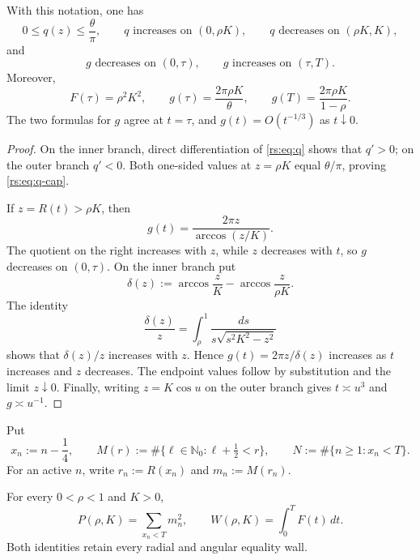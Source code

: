 \begin{lemma}
\label{rs:lem:shape}
With this notation, one has
\begin{equation}
 0\leq q(z)\leq\frac{\theta}{\pi},
 \qquad
 q\text{ increases on }(0,\rho K),
 \qquad q\text{ decreases on }(\rho K,K),
 \label{rs:eq:q-cap}
\end{equation}
and
\begin{equation}
 g\text{ decreases on }(0,\tau),
 \qquad g\text{ increases on }(\tau,T).
 \label{rs:eq:g-shape}
\end{equation}
Moreover,
\begin{equation}
 F(\tau)=\rho^2K^2,
 \qquad
 g(\tau)=\frac{2\pi\rho K}{\theta},
 \qquad
 g(T)=\frac{2\pi\rho K}{1-\rho}.
 \label{rs:eq:g-data}
\end{equation}
The two formulas for $g$ agree at $t=\tau$, and
$g(t)=O(t^{-1/3})$ as $t\downarrow0$.
\end{lemma}

\begin{proof}
On the inner branch, direct differentiation of \eqref{rs:eq:q} shows that
$q'>0$; on the outer branch $q'<0$.  Both one-sided values at
$z=\rho K$ equal $\theta/\pi$, proving \eqref{rs:eq:q-cap}.

If $z=R(t)>\rho K$, then
\[
 g(t)=\frac{2\pi z}{\arccos(z/K)}.
\]
The quotient on the right increases with $z$, while $z$ decreases with
$t$, so $g$ decreases on $(0,\tau)$.  On the inner branch put
\[
 \delta(z):=\arccos\frac zK-\arccos\frac z{\rho K}.
\]
The identity
\[
 \frac{\delta(z)}z
 =\int_\rho^1\frac{ds}{s\sqrt{s^2K^2-z^2}}
\]
shows that $\delta(z)/z$ increases with $z$.  Hence
$g(t)=2\pi z/\delta(z)$ increases as $t$ increases and $z$ decreases.
The endpoint values follow by substitution and the limit $z\downarrow0$.
Finally, writing $z=K\cos u$ on the outer branch gives
$t\asymp u^3$ and $g\asymp u^{-1}$.
\end{proof}

Put
\begin{equation}
 x_n:=n-\frac14,
 \qquad
 M(r):=\#\{\ell\in\mathbb N_0:\ell+\tfrac12<r\},
 \qquad
 N:=\#\{n\geq1:x_n<T\}.
 \label{rs:eq:grids}
\end{equation}
For an active $n$, write $r_n:=R(x_n)$ and $m_n:=M(r_n)$.

\begin{lemma}
\label{rs:lem:layer-cake}
For every $0<\rho<1$ and $K>0$,
\begin{equation}
 P(\rho,K)=\sum_{x_n<T}m_n^2,
 \qquad
 W(\rho,K)=\int_0^T F(t)\,dt.
 \label{rs:eq:layer-cake}
\end{equation}
Both identities retain every radial and angular equality wall.
\end{lemma}

